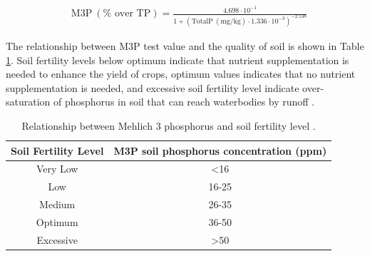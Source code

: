 \documentclass[authoryear]{elsarticle}
\begin{document}
\begin{align}
& \text{M3P} \ (\% \text{ over TP}) = \frac{4.698 \cdot 10^{-1}}{1+\left(\text{TotalP} \ (\text{mg}/\text{kg}) \cdot 1.336 \cdot 10^{-3}\right)^{-2.148}} \label{eq:Mehlich3}
\end{align}

The relationship between M3P test value and the quality of soil is shown in Table \ref{table:soil_fertility}. Soil fertility levels below optimum indicate that nutrient supplementation is needed to enhance the yield of crops, optimum values indicates that no nutrient supplementation is needed, and excessive soil fertility level indicate over-saturation of phosphorus in soil that can reach waterbodies by runoff \citep{Espinoza2006}.

\begin{table}[H]
	\centering
	\caption{Relationship between Mehlich 3 phosphorus and soil fertility level \protect\citep{Espinoza2006}.}
	\label{table:soil_fertility}
	\begin{tabular}{@{}cc@{}}
		\toprule
		Soil Fertility Level & M3P soil phosphorus concentration (ppm) \\ \midrule
		Very Low             & \textless{}16                           \\
		Low                  & 16-25                                   \\
		Medium               & 26-35                                   \\
		Optimum              & 36-50                                   \\
		Excessive            & \textgreater{}50                        \\ \bottomrule
	\end{tabular}
\end{table}
\end{document}
